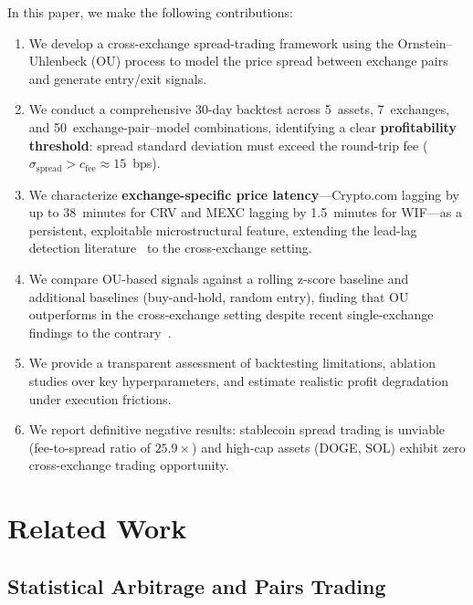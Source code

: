 \documentclass[sigconf,nonacm=false]{acmart}
\begin{document}
In this paper, we make the following contributions:
\begin{enumerate}
    \item We develop a cross-exchange spread-trading framework using the Ornstein--Uhlenbeck (OU) process to model the price spread between exchange pairs and generate entry/exit signals.
    \item We conduct a comprehensive 30-day backtest across 5~assets, 7~exchanges, and 50~exchange-pair--model combinations, identifying a clear \textbf{profitability threshold}: spread standard deviation must exceed the round-trip fee ($\sigma_{\text{spread}} > c_{\text{fee}} \approx 15$~bps).
    \item We characterize \textbf{exchange-specific price latency}---Crypto.com lagging by up to 38~minutes for CRV and MEXC lagging by 1.5~minutes for WIF---as a persistent, exploitable microstructural feature, extending the lead-lag detection literature~\cite{zhang2023dtw, shi2023multireference} to the cross-exchange setting.
    \item We compare OU-based signals against a rolling z-score baseline and additional baselines (buy-and-hold, random entry), finding that OU outperforms in the cross-exchange setting despite recent single-exchange findings to the contrary~\cite{suchato2024application}.
    \item We provide a transparent assessment of backtesting limitations, ablation studies over key hyperparameters, and estimate realistic profit degradation under execution frictions.
    \item We report definitive negative results: stablecoin spread trading is unviable (fee-to-spread ratio of $25.9\times$) and high-cap assets (DOGE, SOL) exhibit zero cross-exchange trading opportunity.
\end{enumerate}

\section{Related Work}\label{sec:related}

\subsection{Statistical Arbitrage and Pairs Trading}
\end{document}
